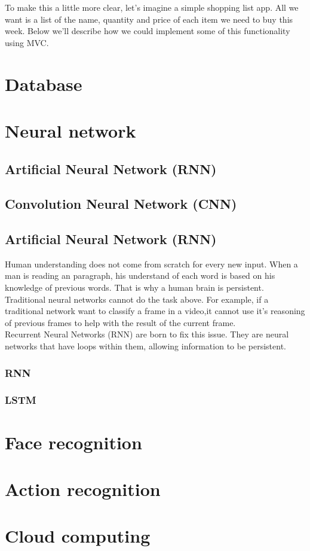 To make this a little more clear, let's imagine a simple shopping list app. All we want is a list of the name, quantity and price of each item we need to buy this week. Below we'll describe how we could implement some of this functionality using MVC.

\section{Database}
\section{Neural network}
\subsection{Artificial Neural Network (RNN)}
\subsection{Convolution Neural Network (CNN)}

\subsection{Artificial Neural Network (RNN)}
Human understanding does not come from scratch for every new input. When a man is reading an paragraph, his understand of each word is based on his knowledge of previous words. That is why a human brain is persistent.\\
Traditional neural networks cannot do the task above. For example, if a traditional network want to classify a frame in a video,it cannot use it's reasoning of previous frames to help with the result of the current frame. \\
Recurrent Neural Networks (RNN) are born to fix this issue. They are neural networks that have loops within them, allowing information to be persistent. 
\subsubsection{RNN}
\subsubsection{LSTM}


\section{Face recognition}
\section{Action recognition}
\section{Cloud computing}
